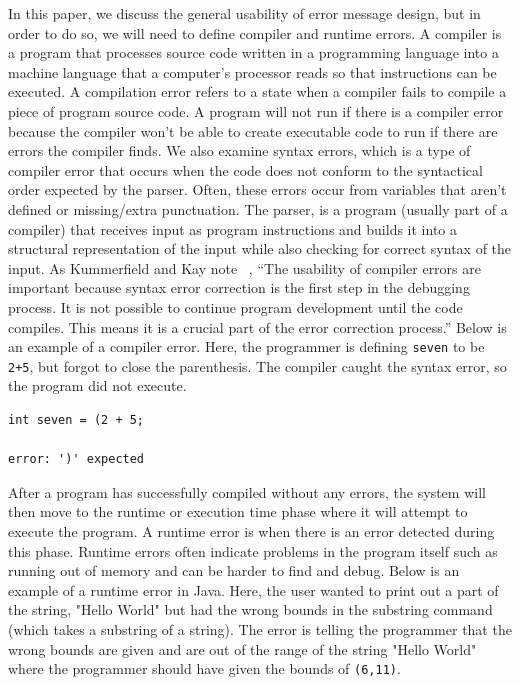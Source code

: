 \documentclass{sig-alternate}
\begin{document}
In this paper, we discuss the general usability of error message design, but in order to do so, we will need to define compiler and runtime errors.
A compiler is a program that processes source code written in a programming language into a machine language that a computer's processor reads so that instructions can be executed.
A compilation error refers to a state when a compiler fails to compile a piece of  program source code.
A program will not run if there is a compiler error because the compiler won't be able to create executable code to run if there are errors the compiler finds. 
We also examine syntax errors, which is a type of compiler error that occurs when the code does not conform to the syntactical order expected by the parser.
Often, these errors occur from variables that aren't defined or missing/extra punctuation.
The parser, is a program (usually part of a compiler) that receives input as program instructions and builds it into a structural representation of the input while also checking for correct syntax of the input.
As Kummerfield and Kay note ~\cite{Kummerfeld:2003:NBF:858403.858416}, ``The usability of compiler errors are important because syntax error correction is the first step in the debugging process. It is not possible to continue program development until the code compiles. This means it is a crucial part of the error correction process.''
Below is an example of a compiler error. Here, the programmer is defining \texttt{seven} to be \texttt{2+5}, but forgot to close the parenthesis. The compiler caught the syntax error, so the program did not execute.

\begin{verbatim}
int seven = (2 + 5;

error: ')' expected
\end{verbatim}

After a program has successfully compiled without any errors, the system will then move to the runtime or execution time phase where it will attempt to execute the program.
A runtime error is when there is an error detected during this phase.
Runtime errors often indicate problems in the program itself such as running out of memory and can be harder to find and debug.
Below is an example of a runtime error in Java.
Here, the user wanted to print out a part of the string, "Hello World" but had the wrong bounds in the substring command (which takes a substring of a string).
The error is telling the programmer that the wrong bounds are given and are out of the range of the string "Hello World" where the programmer should have given the bounds of \texttt{(6,11)}.
\end{document}
